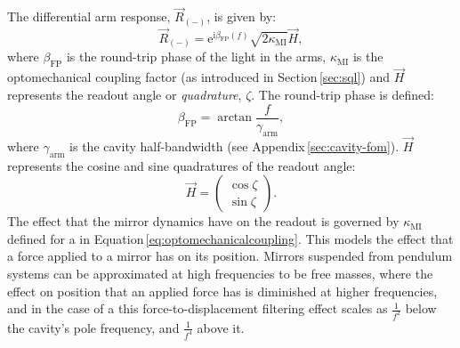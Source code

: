 The differential arm response, $\vec{R}_{\left( - \right)}$, is given by:
\begin{equation}
  \label{eq:fp-mich-response}
  \vec{R}_{\left( - \right)} = \text{e}^{\text{i} \beta_{\text{FP}} \left( f \right)} \sqrt{2 \kappa_{\text{MI}}} \vec{H},
\end{equation}
where $\beta_{\text{FP}}$ is the round-trip phase of the light in the arms, $\kappa_{\text{MI}}$ is the optomechanical coupling factor (as introduced in Section\,\ref{sec:sql}) and $\vec{H}$ represents the readout angle or \emph{quadrature}, $\zeta$. The round-trip phase is defined:
\begin{equation}
  \beta_{\text{FP}} = \arctan{\frac{f}{\gamma_{\text{arm}}}},
\end{equation}
where $\gamma_{\text{arm}}$ is the \FP{} cavity half-bandwidth (see Appendix\,\ref{sec:cavity-fom}). $\vec{H}$ represents the cosine and sine quadratures of the readout angle:
\begin{equation}
  \vec{H} =
  \begin{pmatrix}
    \cos \zeta \\
    \sin \zeta
  \end{pmatrix}.
\end{equation}
The effect that the mirror dynamics have on the readout is governed by $\kappa_{\text{MI}}$ defined for a \MI{} in Equation\,\ref{eq:optomechanicalcoupling}. This models the effect that a force applied to a mirror has on its position. Mirrors suspended from pendulum systems can be approximated at high frequencies to be free masses, where the effect on position that an applied force has is diminished at higher frequencies, and in the case of a \FPMI{} this force-to-displacement filtering effect scales as $\frac{1}{f^2}$ below the cavity's pole frequency, and $\frac{1}{f^4}$ above it.

